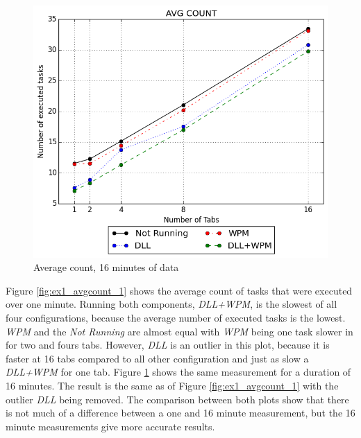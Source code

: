 \begin{figure}[!htbp]
	\centering
    \includegraphics[width=\textwidth,keepaspectratio]{Evaluation/experiment1/AVG-COUNT-16.png}
    \caption{Average count, 16 minutes of data}
    \label{fig:ex1_avgcount_16}
\end{figure}
Figure \ref{fig:ex1_avgcount_1} shows the average count of tasks that were executed over one minute. Running both components, \emph{DLL+WPM}, is the slowest of all four configurations, because the average number of executed tasks is the lowest. \emph{WPM} and the \emph{Not Running} are almost equal with \emph{WPM} being one task slower in for two and fours tabs. However, \emph{DLL} is an outlier in this plot, because it is faster at 16 tabs compared to all other configuration and just as slow a \emph{DLL+WPM} for one tab. Figure \ref{fig:ex1_avgcount_16} shows the same measurement for a duration of 16 minutes. The result is the same as of Figure \ref{fig:ex1_avgcount_1} with the outlier \emph{DLL} being removed. The comparison between both plots show that there is not much of a difference between a one and 16 minute measurement, but the 16 minute measurements give more accurate results.

